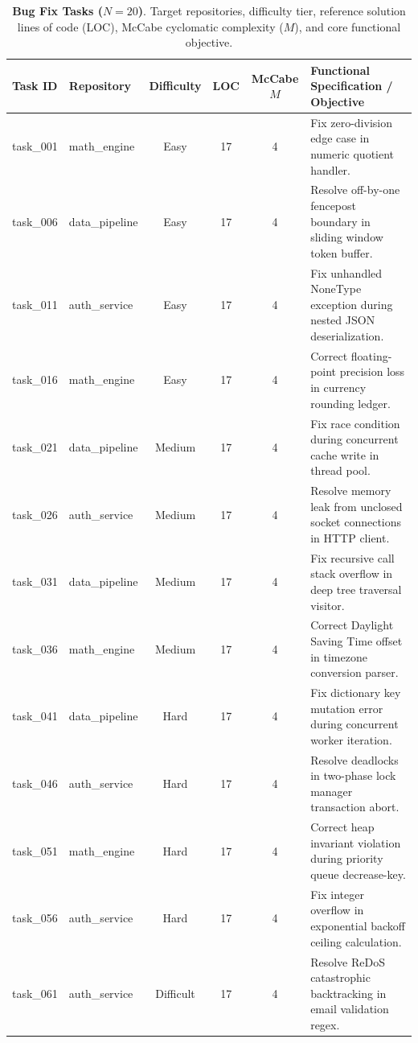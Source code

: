 
\begin{table}[t]
\centering
\scriptsize
\caption{\textbf{Bug Fix Tasks ($N=20$)}. Target repositories, difficulty tier, reference solution lines of code (LOC), McCabe cyclomatic complexity ($M$), and core functional objective.}
\label{tab:tasks_bug_fix}
\begin{tabular}{llcccl}
\toprule
\textbf{Task ID} & \textbf{Repository} & \textbf{Difficulty} & \textbf{LOC} & \textbf{McCabe $M$} & \textbf{Functional Specification / Objective} \\
\midrule
task\_001 & math\_engine & Easy & 17 & 4 & Fix zero-division edge case in numeric quotient handler. \\
task\_006 & data\_pipeline & Easy & 17 & 4 & Resolve off-by-one fencepost boundary in sliding window token buffer. \\
task\_011 & auth\_service & Easy & 17 & 4 & Fix unhandled NoneType exception during nested JSON deserialization. \\
task\_016 & math\_engine & Easy & 17 & 4 & Correct floating-point precision loss in currency rounding ledger. \\
task\_021 & data\_pipeline & Medium & 17 & 4 & Fix race condition during concurrent cache write in thread pool. \\
task\_026 & auth\_service & Medium & 17 & 4 & Resolve memory leak from unclosed socket connections in HTTP client. \\
task\_031 & data\_pipeline & Medium & 17 & 4 & Fix recursive call stack overflow in deep tree traversal visitor. \\
task\_036 & math\_engine & Medium & 17 & 4 & Correct Daylight Saving Time offset in timezone conversion parser. \\
task\_041 & data\_pipeline & Hard & 17 & 4 & Fix dictionary key mutation error during concurrent worker iteration. \\
task\_046 & auth\_service & Hard & 17 & 4 & Resolve deadlocks in two-phase lock manager transaction abort. \\
task\_051 & math\_engine & Hard & 17 & 4 & Correct heap invariant violation during priority queue decrease-key. \\
task\_056 & auth\_service & Hard & 17 & 4 & Fix integer overflow in exponential backoff ceiling calculation. \\
task\_061 & auth\_service & Difficult & 17 & 4 & Resolve ReDoS catastrophic backtracking in email validation regex. \\

\end{tabular}
\end{table}
